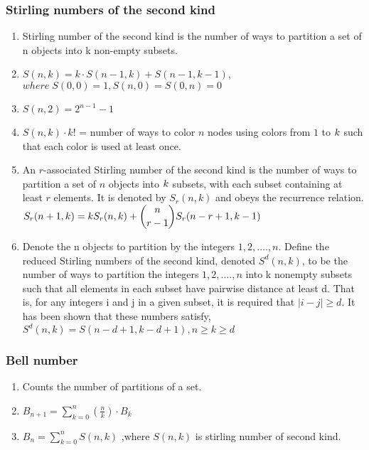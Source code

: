 \subsubsection{Stirling numbers of the second kind}\begin{enumerate}

            
            \item Stirling number of the second kind is the number of ways to partition a set of n objects into k
                non-empty
                subsets.
            \item $S(n,k)=k \cdot S(n-1,k)+S(n-1,k-1)$,
                \(where \; S(0,0)=1,S(n,0)=S(0,n)=0\)
            \item $S(n,2)=2^{n-1}-1$
            \item $S(n,k) \cdot k!$ = number of ways to color $n$ nodes using colors from $\displaystyle 1$ to
                $\displaystyle
                \displaystyle k$ such that each color is used at least once.
            \item An $r$-associated Stirling number of the second kind is the number of ways to partition a set of $n$
                objects
                into $\displaystyle \displaystyle k$ subsets, with each subset containing at least $r$ elements. It is
                denoted
                by $S_r( n , k )$ and obeys the recurrence relation.
                $\displaystyle \displaystyle S_r(n+1,k) = k S_r(n,k) + \binom{n}{r-1} S_r(n-r+1,k-1)$
            \item 
                Denote the n objects to partition by the integers $\displaystyle 1, 2, …., n$. Define the reduced
                    Stirling
                    numbers of the second kind, denoted $S^d(n, k)$, to be the number of ways to partition the integers
                    $\displaystyle 1, 2, …., n$ into k nonempty subsets such that all elements in each subset have
                    pairwise
                    distance at least d.
                    That is, for any integers i and j in a given subset, it is required that $|i - j| \geq d$. It has
                    been
                    shown
                    that these numbers satisfy,
                    \(S^d(n, k) = S(n - d + 1, k - d + 1), n \geq k \geq d\)

                \end{enumerate}
\subsubsection{Bell number}\begin{enumerate}

            
            \item Counts the number of partitions of a set.
            \item $B_{n+1}=\displaystyle\sum_{k=0}^{n}\left(\frac{n}{k}\right) \cdot B_{k}$
            \item 
                $B_{n}=\displaystyle\sum_{k=0}^{n}S(n,k)$ ,where $S(n,k)$ is stirling number of second kind.

            
        \end{enumerate}
